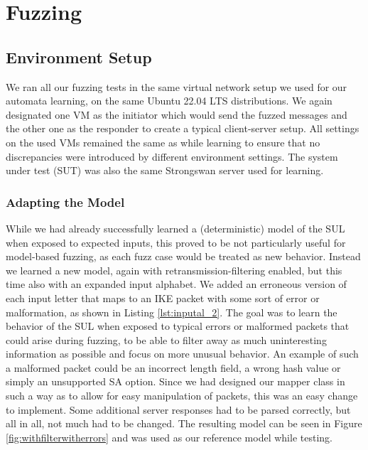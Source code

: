 %
%
% 
% 
% 

\chapter{Fuzzing}

\label{chap:Fuzzing}

\section{Environment Setup} \label{sec:environment}
We ran all our fuzzing tests in the same virtual network setup we used for our automata learning, on the same Ubuntu 22.04 LTS distributions. We again designated one VM as the initiator which would send the fuzzed messages and the other one as the responder to create a typical client-server setup. All settings on the used VMs remained the same as while learning to ensure that no discrepancies were introduced by different environment settings. The system under test (SUT) was also the same Strongswan server used for learning. 

\subsection{Adapting the Model} \label{subsec:adapting_model}
While we had already successfully learned a (deterministic) model of the SUL when exposed to expected inputs, this proved to be not particularly useful for model-based fuzzing, as each fuzz case would be treated as new behavior. Instead we learned a new model, again with retransmission-filtering enabled, but this time also with an expanded input alphabet. We added an erroneous version of each input letter that maps to an IKE packet with some sort of error or malformation, as shown in Listing \ref{lst:inputal_2}. The goal was to learn the behavior of the SUL when exposed to typical errors or malformed packets that could arise during fuzzing, to be able to filter away as much uninteresting information as possible and focus on more unusual behavior. An example of such a malformed packet could be an incorrect length field, a wrong hash value or simply an unsupported SA option. Since we had designed our mapper class in such a way as to allow for easy manipulation of packets, this was an easy change to implement. Some additional server responses had to be parsed correctly, but all in all, not much had to be changed. The resulting model can be seen in Figure \ref{fig:withfilterwitherrors} and was used as our reference model while testing.  

